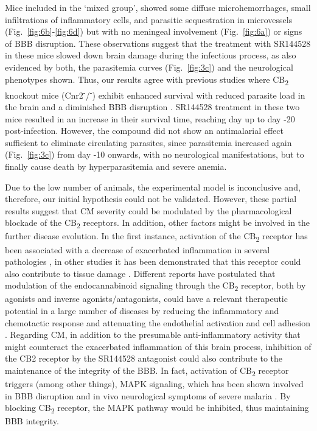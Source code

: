 \documentclass[empirical, authordate]{jote-new-article}
\begin{document}
Mice included in the `mixed group', showed some diffuse microhemorrhages, small infiltrations of inflammatory cells, and parasitic sequestration in microvessels (Fig.~\ref{fig:6b}-\ref{fig:6d}) but with no meningeal involvement (Fig.~\ref{fig:6a}) or signs of BBB disruption. These observations suggest that the treatment with SR144528 in these mice slowed down brain damage during the infectious process, as also evidenced by both, the parasitemia curves (Fig.~\ref{fig:3c}) and the neurological phenotypes shown. Thus, our results agree with previous studies where CB\textsubscript{2} knockout mice (Cnr2\textsuperscript{-}/\textsuperscript{-}) exhibit enhanced survival with reduced parasite load in the brain and a diminished BBB disruption \parencite{Alferink2016}. SR144528 treatment in these two mice resulted in an increase in their survival time, reaching day up to day -20 post-infection. However, the compound did not show an antimalarial effect sufficient to eliminate circulating parasites, since parasitemia increased again (Fig.~\ref{fig:3c}) from day -10 onwards, with no neurological manifestations, but to finally cause death by hyperparasitemia and severe anemia.



Due to the low number of animals, the experimental model is inconclusive and, therefore, our initial hypothesis could not be validated. However, these partial results suggest that CM severity could be modulated by the pharmacological blockade of the CB\textsubscript{2} receptors. In addition, other factors might be involved in the further disease evolution. In the first instance, activation of the CB\textsubscript{2} receptor has been associated with a decrease of exacerbated inflammation in several pathologies \parencite{Morales2016, Turcotte2016, Fernández-Ruiz2006, Fernández-Ruiz2015}, in other studies it has been demonstrated that this receptor could also contribute to tissue damage \parencite{Pacher2011}. Different reports have postulated that modulation of the endocannabinoid signaling through the CB\textsubscript{2} receptor, both by agonists and inverse agonists/antagonists, could have a relevant therapeutic potential in a large number of diseases by reducing the inflammatory and chemotactic response and attenuating the endothelial activation and cell adhesion \parencite{Pacher2011}. Regarding CM, in addition to the presumable anti-inflammatory activity that might counteract the exacerbated inflammation of this brain process, inhibition of the CB2 receptor by the SR144528 antagonist could also contribute to the maintenance of the integrity of the BBB. In fact, activation of CB\textsubscript{2} receptor triggers (among other things), MAPK signaling, which has been shown involved in BBB disruption and in vivo neurological symptoms of severe malaria \parencite{Picone2015, Rhee2002}. By blocking CB\textsubscript{2} receptor, the MAPK pathway would be inhibited, thus maintaining BBB integrity.
\end{document}
